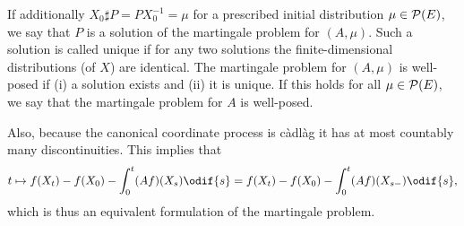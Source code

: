 If additionally \( X_0 \sharp P = P X_0^{-1} = \mu \) for a prescribed initial distribution \(\mu \in \mathcal{P}(E)\), we say that \(P\) is a solution of the martingale problem for \((A,\mu)\).
Such a solution is called unique if for any two solutions the finite-dimensional distributions (of \(X\)) are identical.
The martingale problem for \((A,\mu)\) is well-posed if (i) a solution exists and (ii) it is unique.
If this holds for all \(\mu \in \mathcal{P}(E)\), we say that the martingale problem for \(A\) is well-posed.

Also, because the canonical coordinate process is càdlàg it has at most countably many discontinuities.
This implies that
\begin{equation}\label{eq:mart-problem-s-}
  t \mapsto f(X_t) - f(X_0) - \int_0^t (Af)(X_s) \odif{s}
  = f(X_t) - f(X_0) - \int_0^t (Af)(X_{s-}) \odif{s},
\end{equation}
which is thus an equivalent formulation of the martingale problem.
